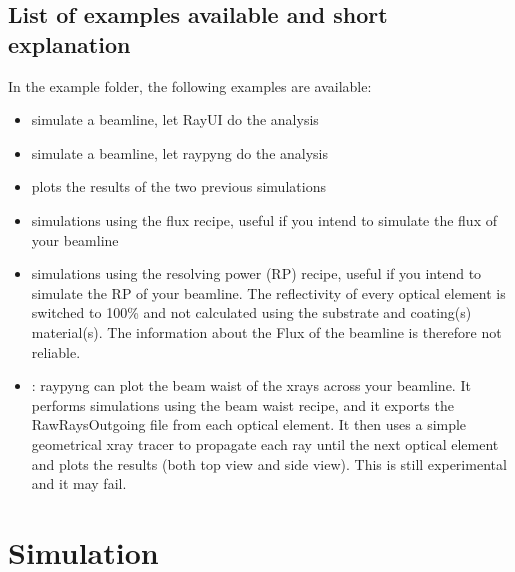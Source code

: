 \documentclass[letterpaper,10pt,english]{sphinxmanual}
\begin{document}
\section{List of examples available and short explanation}
\label{\detokenize{tutorial:list-of-examples-available-and-short-explanation}}
\sphinxAtStartPar
In the example folder, the following examples are available:
\begin{itemize}
\item {} 
\sphinxAtStartPar
{} simulate a beamline,
let Ray\sphinxhyphen{}UI do the analysis

\item {} 
\sphinxAtStartPar
{} simulate a beamline,
let raypyng do the analysis

\item {} 
\sphinxAtStartPar
{} plots the results
of the two previous simulations

\item {} 
\sphinxAtStartPar
{} simulations using the flux recipe,
useful if you intend to simulate the flux of your beamline

\item {} 
\sphinxAtStartPar
{} simulations using the resolving power
(RP) recipe, useful if you intend to simulate the RP of your beamline.
The reflectivity of every optical element is switched to 100\% and not
calculated using the substrate and coating(s) material(s). The
information about the Flux of the beamline is therefore not reliable.

\item {} 
\sphinxAtStartPar
{}: raypyng can plot the beam waist of
the x\sphinxhyphen{}rays across your beamline. It performs simulations using the beam waist recipe,
and it exports the RawRaysOutgoing file from each optical element. It then uses a
simple geometrical x\sphinxhyphen{}ray tracer to propagate each ray until the next optical
element and plots the results (both top view and side view). This is still
experimental and it may fail.

\end{itemize}

\sphinxstepscope


\chapter{Simulation}
\label{\detokenize{code_documentation:simulation}}\label{\detokenize{code_documentation::doc}}
\end{document}
